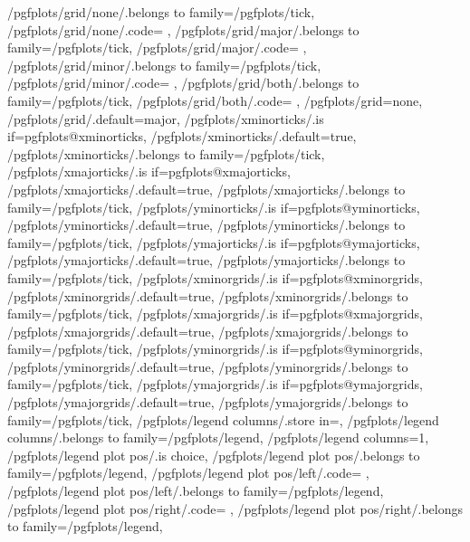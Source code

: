 {	/pgfplots/grid/none/.belongs to family=/pgfplots/tick,
	/pgfplots/grid/none/.code={%
		\pgfplots@xminorgridsfalse
		\pgfplots@yminorgridsfalse
		\pgfplots@xmajorgridsfalse
		\pgfplots@ymajorgridsfalse
	},
	/pgfplots/grid/major/.belongs to family=/pgfplots/tick,
	/pgfplots/grid/major/.code={%
		\pgfplots@xminorgridsfalse
		\pgfplots@yminorgridsfalse
		\pgfplots@xmajorgridstrue
		\pgfplots@ymajorgridstrue
	},
	/pgfplots/grid/minor/.belongs to family=/pgfplots/tick,
	/pgfplots/grid/minor/.code={%
		\pgfplots@xminorgridstrue
		\pgfplots@yminorgridstrue
		\pgfplots@xmajorgridsfalse
		\pgfplots@ymajorgridsfalse
	},
	/pgfplots/grid/both/.belongs to family=/pgfplots/tick,
	/pgfplots/grid/both/.code={%
		\pgfplots@xminorgridstrue
		\pgfplots@yminorgridstrue
		\pgfplots@xmajorgridstrue
		\pgfplots@ymajorgridstrue
	},
	/pgfplots/grid=none,
	/pgfplots/grid/.default=major,
	/pgfplots/xminorticks/.is if=pgfplots@xminorticks,
	/pgfplots/xminorticks/.default=true,
	/pgfplots/xminorticks/.belongs to family=/pgfplots/tick,
	/pgfplots/xmajorticks/.is if=pgfplots@xmajorticks,
	/pgfplots/xmajorticks/.default=true,
	/pgfplots/xmajorticks/.belongs to family=/pgfplots/tick,
	/pgfplots/yminorticks/.is if=pgfplots@yminorticks,
	/pgfplots/yminorticks/.default=true,
	/pgfplots/yminorticks/.belongs to family=/pgfplots/tick,
	/pgfplots/ymajorticks/.is if=pgfplots@ymajorticks,
	/pgfplots/ymajorticks/.default=true,
	/pgfplots/ymajorticks/.belongs to family=/pgfplots/tick,
	/pgfplots/xminorgrids/.is if=pgfplots@xminorgrids,
	/pgfplots/xminorgrids/.default=true,
	/pgfplots/xminorgrids/.belongs to family=/pgfplots/tick,
	/pgfplots/xmajorgrids/.is if=pgfplots@xmajorgrids,
	/pgfplots/xmajorgrids/.default=true,
	/pgfplots/xmajorgrids/.belongs to family=/pgfplots/tick,
	/pgfplots/yminorgrids/.is if=pgfplots@yminorgrids,
	/pgfplots/yminorgrids/.default=true,
	/pgfplots/yminorgrids/.belongs to family=/pgfplots/tick,
	/pgfplots/ymajorgrids/.is if=pgfplots@ymajorgrids,
	/pgfplots/ymajorgrids/.default=true,
	/pgfplots/ymajorgrids/.belongs to family=/pgfplots/tick,
	/pgfplots/legend columns/.store in=\pgfplots@legend@columns,
	/pgfplots/legend columns/.belongs to family=/pgfplots/legend,
	/pgfplots/legend columns=1,
	/pgfplots/legend plot pos/.is choice,
	/pgfplots/legend plot pos/.belongs to family=/pgfplots/legend,
	/pgfplots/legend plot pos/left/.code=	{\def\pgfplots@legend@plot@pos{0}},
	/pgfplots/legend plot pos/left/.belongs to family=/pgfplots/legend,
	/pgfplots/legend plot pos/right/.code=	{\def\pgfplots@legend@plot@pos{1}},
	/pgfplots/legend plot pos/right/.belongs to family=/pgfplots/legend,
}
